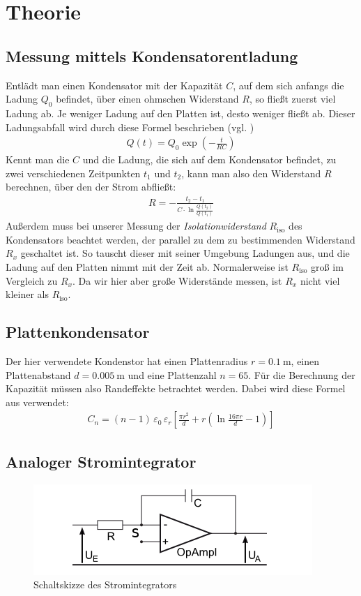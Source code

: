 \documentclass[12pt,a4paper,titlepage,headinclude,bibtotoc]{scrartcl}
\begin{document}
\section{Theorie}
\label{sec:theorie}
\subsection{Messung mittels Kondensatorentladung}
Entlädt man einen Kondensator mit der Kapazität $C$, auf dem sich anfangs die Ladung $Q_0$ befindet, über einen ohmschen Widerstand $R$, so fließt zuerst viel Ladung ab.
Je weniger Ladung auf den Platten ist, desto weniger fließt ab.
Dieser Ladungsabfall wird durch diese Formel beschrieben (vgl. \cite[S.51]{demtroeder2})
\begin{align}
	Q(t)=Q_0 \exp \left(-\frac{t}{RC}\right)
	\label{eq:Q(t)}
\end{align}
Kennt man die $C$ und die Ladung, die sich auf dem Kondensator befindet, zu zwei verschiedenen Zeitpunkten $t_1$ und $t_2$, kann man also den Widerstand $R$ berechnen, über den der Strom abfließt:
\begin{align*}
	R=-\frac{t_2-t_1}{C\cdot\ln\frac{Q(t_2)}{Q(t_1)}}
\end{align*}
Außerdem muss bei unserer Messung der \textit{Isolationwiderstand} $R_\text{iso}$ des Kondensators beachtet werden, der parallel zu dem zu bestimmenden Widerstand $R_x$ geschaltet ist.
So tauscht dieser mit seiner Umgebung Ladungen aus, und die Ladung auf den Platten nimmt mit der Zeit ab.
Normalerweise ist $R_\text{iso}$ groß im Vergleich zu $R_x$.
Da wir hier aber große Widerstände messen, ist $R_x$ nicht viel kleiner als $R_\text{iso}$.

\subsection{Plattenkondensator}
Der hier verwendete Kondenstor hat einen Plattenradius $r=0.1~\si{\meter}$, einen Plattenabstand $d=0.005~\si{\meter}$ und eine Plattenzahl $n=65$.
Für die Berechnung der Kapazität müssen also Randeffekte betrachtet werden.
Dabei wird diese Formel aus \cite[S.101]{prakti} verwendet:
\begin{align}	
	C_n=(n-1)\,\varepsilon_0\,\varepsilon_r\left[\frac{\pi r^2}{d}+r\left(\ln\frac{16\pi r}{d}-1\right)\right]
	\label{eq:C_Pl}
\end{align}

\newpage
\subsection{Analoger Stromintegrator}
\begin{figure}[!h]
	\centering
	\includegraphics[scale=0.8]{Stromintegrator.png}
	\caption{Schaltskizze des Stromintegrators \cite[Datum: 25.09.2014]{LP11}}
	\label{fig:Stromintegrator}
\end{figure}
\end{document}
